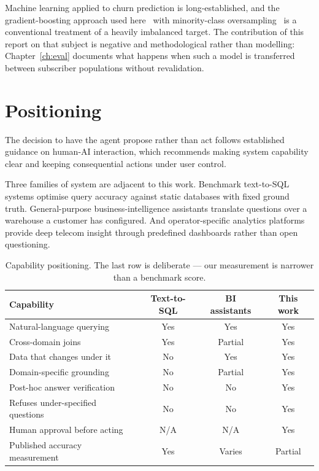 Machine learning applied to churn prediction is long-established, and the
gradient-boosting approach used here~\cite{xgboost} with minority-class
oversampling~\cite{smote} is a conventional treatment of a heavily imbalanced
target. The contribution of this report on that subject is negative and
methodological rather than modelling: Chapter~\ref{ch:eval} documents what
happens when such a model is transferred between subscriber populations without
revalidation.

\section{Positioning}

The decision to have the agent propose rather than act follows established
guidance on human-AI interaction, which recommends making system capability
clear and keeping consequential actions under user control\cite{humanai_guidelines}.

Three families of system are adjacent to this work. Benchmark text-to-SQL
systems optimise query accuracy against static databases with fixed ground
truth. General-purpose business-intelligence assistants translate questions over
a warehouse a customer has configured. And operator-specific analytics platforms
provide deep telecom insight through predefined dashboards rather than open
questioning.

\begin{table}[H]
\centering
\begin{tabular}{lccc}
\toprule
\textbf{Capability} & \textbf{Text-to-SQL} & \textbf{BI assistants} & \textbf{This work} \\
\midrule
Natural-language querying      & Yes & Yes & Yes \\
Cross-domain joins             & Yes & Partial & Yes \\
Data that changes under it     & No  & Yes & Yes \\
Domain-specific grounding      & No  & Partial & Yes \\
Post-hoc answer verification   & No  & No & Yes \\
Refuses under-specified questions & No & No & Yes \\
Human approval before acting   & N/A & N/A & Yes \\
Published accuracy measurement & Yes & Varies & Partial \\
\bottomrule
\end{tabular}
\caption{Capability positioning. The last row is deliberate --- our
measurement is narrower than a benchmark score.}
\label{tab:positioning}
\end{table}

